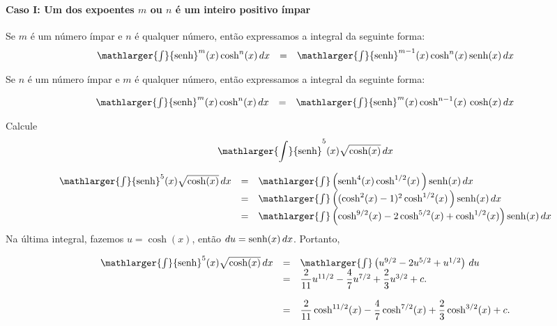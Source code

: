 \cleardoublepage\documentclass[../main.tex]{subfiles}
\begin{document}
\paragraph*{Caso I: Um dos expoentes \(m\) ou \(n\) é um inteiro positivo ímpar}
\begin{compactenum}[i.]
\item Se \(m\) é um número ímpar e \(n\) é qualquer número, então expressamos a integral da seguinte forma:
\[ \begin{array}{lcl} \mathlarger{\int}{\rm senh}^m(x) \cosh^n(x)\,dx &=& \mathlarger{\int}{\rm senh}^{m-1}( x) \cosh^n (x)\,{\rm senh} (x)\,dx\end{array} \]
\item Se \(n\) é um número ímpar e \(m\) é qualquer número, então expressamos a integral da seguinte forma:

\[ \begin{array}{lcl} \mathlarger{\int}{\rm senh}^m (x) \cosh^n(x)\,dx &=& \mathlarger{\int}{\rm senh}^{m}( x) \cosh^{n-1} (x)\,\cosh (x)\,dx\\ \end{array} \]
\end{compactenum}
\begin{ex}
Calcule
\[\mathlarger{\int}{\rm senh}^5(x) \sqrt{\cosh (x)}\,dx\]

\begin{solution}
\[ \begin{array}{rcl} \mathlarger{\int}{\rm senh}^5(x) \sqrt{\cosh(x)}\,dx &=& \mathlarger{\int}\left({\rm senh}^4(x) \cosh^{1/2}(x)\,\right){\rm senh}(x)\,dx\\ &= &\mathlarger{\int}\left((\cosh^2(x)-1)^2 \cosh^{1/2}(x)\,\right){\rm senh}(x)\,dx\\ &=& \mathlarger{\int}\left(\cosh^{9/2}(x) -2\cosh^{5/2}(x)+ \cosh^{1/2}(x)\right){\rm senh}(x)\,dx \end{array} \]
Na última integral, fazemos \(u=\cosh(x) \), então \(du= {\rm senh}(x)\,dx\). Portanto,

\[ \begin{array}{rcl} \mathlarger{\int}{\rm senh}^5(x) \sqrt{\cosh(x)}\,dx &=& \mathlarger{\int}\left(u^{9/2} -2u^{5/2}+ u^{1/2}\right)\, du\\ &=& \dfrac{2}{11}u^{11/2} -\dfrac{4}{7}u^{7/2}+ \dfrac{2}{3}u^{3/2}+c.\\ \\ &=& \dfrac{2}{11}\cosh^{11/2}(x) -\dfrac{4}{7}\cosh^{7/2}(x)+ \dfrac{2}{3}\cosh^{3/2}(x)+c. \end{array} \]
\end{solution}
\end{ex}
\end{document}
